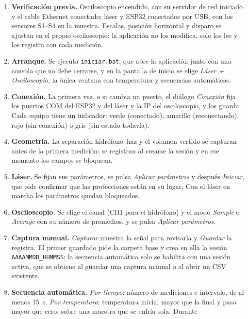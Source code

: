 \begin{enumerate}[leftmargin=*, itemsep=0pt, topsep=2pt]
  \item \textbf{Verificación previa.} Osciloscopio encendido, con su
    servidor de red iniciado y el cable Ethernet conectado; láser y
    ESP32 conectados por USB, con los sensores S1--S4 en la muestra.
    Escalas, posición horizontal y disparo se ajustan en el propio
    osciloscopio: la aplicación no los modifica, solo los lee y los
    registra con cada medición.
  \item \textbf{Arranque.} Se ejecuta \texttt{iniciar.bat}, que abre
    la aplicación junto con una consola que no debe cerrarse, y en la
    pantalla de inicio se elige \emph{Láser + Osciloscopio}, la única
    ventana con temperatura y secuencias automáticas.
  \item \textbf{Conexión.} La primera vez, o si cambia un puerto, el
    diálogo \emph{Conexión} fija los puertos COM del ESP32 y del láser
    y la IP del osciloscopio, y los guarda. Cada equipo tiene un
    indicador: verde (conectado), amarillo (reconectando), rojo (sin
    conexión) o gris (sin estado todavía).
  \item \textbf{Geometría.} La separación hidrófono--haz y el volumen
    vertido se capturan antes de la primera medición: se registran al
    crearse la sesión y en ese momento los campos se bloquean.
  \item \textbf{Láser.} Se fijan sus parámetros, se pulsa
    \emph{Aplicar parámetros} y después \emph{Iniciar}, que pide
    confirmar que las protecciones están en su lugar. Con el láser en
    marcha los parámetros quedan bloqueados.
  \item \textbf{Osciloscopio.} Se elige el canal (CH1 para el
    hidrófono) y el modo \emph{Sample} o \emph{Average} con su número
    de promedios, y se pulsa \emph{Aplicar parámetros}.
  \item \textbf{Captura manual.} \emph{Capturar} muestra la señal para
    revisarla y \emph{Guardar} la registra. El primer guardado pide la
    carpeta base y crea en ella la sesión \texttt{AAAAMMDD\_HHMMSS};
    la secuencia automática solo se habilita con una sesión activa,
    que se obtiene al guardar una captura manual o al abrir un CSV
    existente.
  \item \textbf{Secuencia automática.} \emph{Por tiempo}: número de
    mediciones e intervalo, de al menos \SI{15}{\second}.
    \emph{Por temperatura}: temperatura inicial mayor que la final y
    paso mayor que cero, sobre una muestra que se enfría sola. Durante

\end{enumerate}
